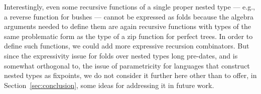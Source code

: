 \documentclass[runningheads]{llncs}
\newcommand{\fold}{\mathit{fold}}
\begin{document}
Interestingly, even some recursive functions of a single proper nested
type --- e.g., a reverse function for bushes --- cannot be expressed
as folds because the algebra arguments needed to define them are again
recursive functions with types of the same problematic form as the
type of a zip function for perfect trees.  In order to define such
functions, we could add more expressive recursion combinators.  But
since the expressivity issue for folds over nested types long
pre-dates, and is somewhat orthogonal to, the issue of parametricity
for languages that construct nested types as fixpoints, we do not
consider it further here other than to offer, in
Section~\ref{sec:conclusion}, some ideas for addressing it in future
work.



\begin{comment}

representing the Agda
$\mathtt{reversePTree}$ function from Figure~\ref{fig:funs} as
$\vdash (\fold_{\beta + \phi(\beta \times \beta)}^{\mathit{PTree}\,
  \alpha})_\emptyset \,
s :
\Nat^{\alpha} (\mathit{PTree}\,\alpha)\,(\mathit{PTree}\,\alpha)$,
where

\pagebreak


\end{comment}
\end{document}
